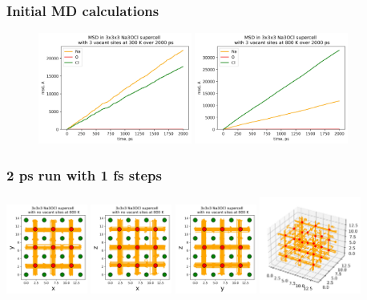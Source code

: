 \documentclass{beamer}
\begin{document}
\begin{frame}
\frametitle{Initial MD calculations}

\begin{figure}
\includegraphics[width=0.45\textwidth]{3v_300k_msd.jpg}
\includegraphics[width=0.45\textwidth]{3v_800k_msd.jpg}
\end{figure}

\end{frame}

\begin{frame}
\frametitle{2 ps run with 1 fs steps}

\includegraphics[width=0.2\textwidth]{800k_3v_xy.jpg}
\includegraphics[width=0.2\textwidth]{800k_3v_xz.jpg}
\includegraphics[width=0.2\textwidth]{800k_3v_yz.jpg}
\includegraphics[width=0.25\textwidth]{800k_3v_3d.jpg}

\end{frame}
\end{document}
